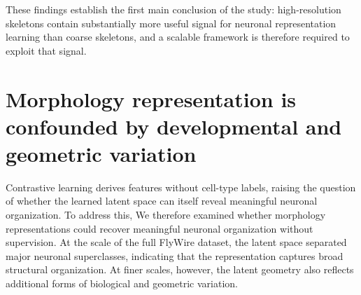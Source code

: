 \documentclass{article}
\begin{document}
These findings establish the first main conclusion of the study: high-resolution skeletons contain substantially more useful signal for neuronal representation learning than coarse skeletons, and a scalable framework is therefore required to exploit that signal.



\section{Morphology representation is confounded by developmental and geometric variation} 

Contrastive learning derives features without cell-type labels, raising the question of whether the learned latent space can itself reveal meaningful neuronal organization. To address this, We therefore examined whether morphology representations could recover meaningful neuronal organization without supervision. At the scale of the full FlyWire dataset, the latent space separated major neuronal superclasses, indicating that the representation captures broad structural organization. At finer scales, however, the latent geometry also reflects additional forms of biological and geometric variation. 
\end{document}
